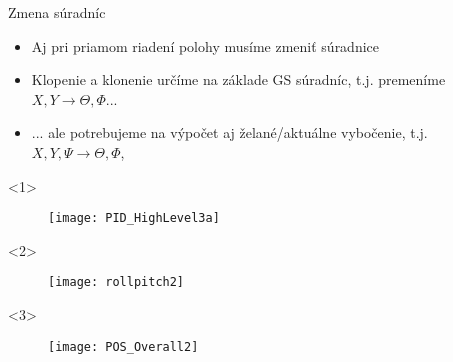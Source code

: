  \begin{frame}[t]{Zmena súradníc}
\begin{itemize}
  \item<1-> Aj pri priamom riadení polohy musíme zmeniť súradnice
  \item<2-> Klopenie a klonenie určíme na základe GS súradníc, t.j. premeníme $X,Y\rightarrow\Theta,\Phi$...
  \item<3->  ...   ale potrebujeme na výpočet aj želané/aktuálne vybočenie, t.j. $X,Y,\Psi\rightarrow\Theta,\Phi$,
\end{itemize}

  \begin{onlyenv}<1>
  \begin{figure}
\centering
  \texttt{[image: PID\_HighLevel3a]}\\
\end{figure}
\end{onlyenv}

  \begin{onlyenv}<2>
  \begin{figure}
\centering
  \texttt{[image: rollpitch2]}\\
\end{figure}
\end{onlyenv}


  \begin{onlyenv}<3>
  \begin{figure}
\centering
  \texttt{[image: POS\_Overall2]}\\
\end{figure}
\end{onlyenv}
\end{frame}

